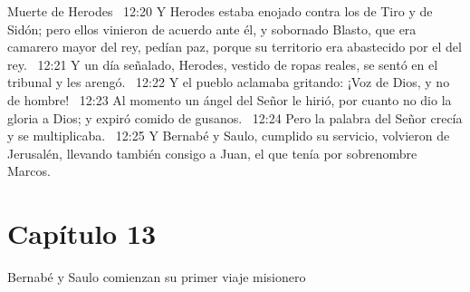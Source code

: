 Muerte de Herodes  
12:20 Y Herodes estaba enojado contra los de Tiro y de Sidón; pero ellos vinieron de acuerdo ante él, y sobornado Blasto, que era camarero mayor del rey, pedían paz, porque su territorio era abastecido por el del rey.  
12:21 Y un día señalado, Herodes, vestido de ropas reales, se sentó en el tribunal y les arengó.  
12:22 Y el pueblo aclamaba gritando: ¡Voz de Dios, y no de hombre!  
12:23 Al momento un ángel del Señor le hirió, por cuanto no dio la gloria a Dios; y expiró comido de gusanos.  
12:24 Pero la palabra del Señor crecía y se multiplicaba.  
12:25 Y Bernabé y Saulo, cumplido su servicio, volvieron de Jerusalén, llevando también consigo a Juan, el que tenía por sobrenombre Marcos. 
\section*{Capítulo 13}
Bernabé y Saulo comienzan su primer viaje misionero  

